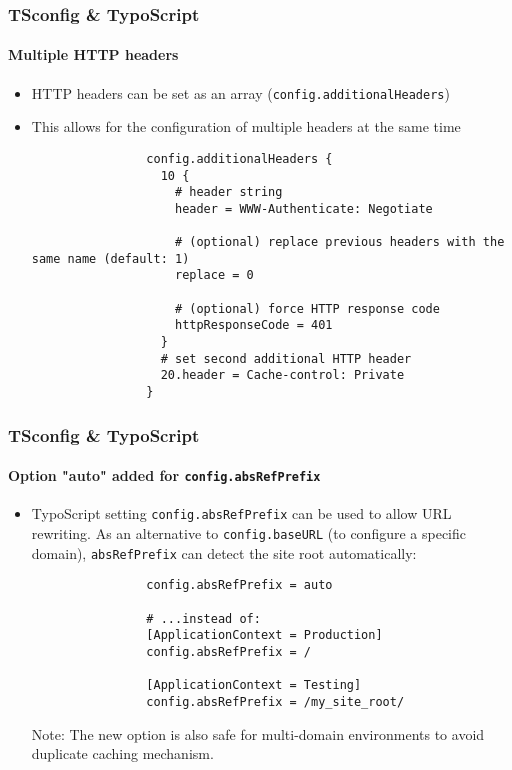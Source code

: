 \begin{frame}[fragile]
	\frametitle{TSconfig \& TypoScript}
	\framesubtitle{Multiple HTTP headers}

	\begin{itemize}

		\item HTTP headers can be set as an array (\small\texttt{config.additionalHeaders}\normalsize)
		\item This allows for the configuration of multiple headers at the same time

			\begin{lstlisting}
				config.additionalHeaders {
				  10 {
				    # header string
				    header = WWW-Authenticate: Negotiate

				    # (optional) replace previous headers with the same name (default: 1)
				    replace = 0

				    # (optional) force HTTP response code
				    httpResponseCode = 401
				  }
				  # set second additional HTTP header
				  20.header = Cache-control: Private
				}
			\end{lstlisting}

	\end{itemize}

\end{frame}


\begin{frame}[fragile]
	\frametitle{TSconfig \& TypoScript}
	\framesubtitle{Option "auto" added for \texttt{config.absRefPrefix}}

	\begin{itemize}
		\item TypoScript setting \texttt{config.absRefPrefix} can be used to allow URL
			rewriting. As an alternative to \texttt{config.baseURL} (to configure a specific
			domain), \texttt{absRefPrefix} can detect the site root automatically:

			\begin{lstlisting}
				config.absRefPrefix = auto

				# ...instead of:
				[ApplicationContext = Production]
				config.absRefPrefix = /

				[ApplicationContext = Testing]
				config.absRefPrefix = /my_site_root/
			\end{lstlisting}

		\smaller
			Note: The new option is also safe for multi-domain environments to avoid
			duplicate caching mechanism.
		\normalsize

	\end{itemize}

\end{frame}

